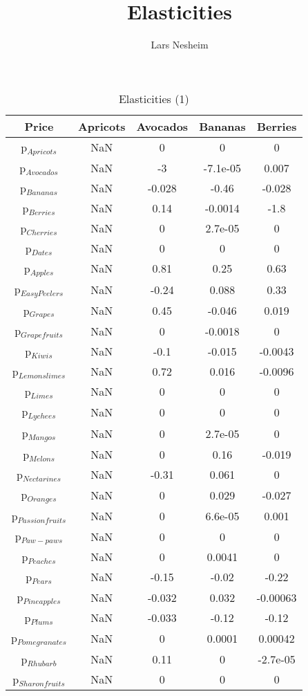 \documentclass[11pt]{article}
\title{Elasticities}
\author{Lars Nesheim}
\date{}
\begin{document}
\maketitle
\begin{table}[h]
\caption{Elasticities (1)}
\label{Table: elasticities 1}
\begin{center}
\begin{tabular}{ccccc}
Price & Apricots & Avocados & Bananas & Berries \\ \hline
p$_{Apricots}$ & NaN & 0 & 0 & 0 \\ 
p$_{Avocados}$ & NaN & -3 & -7.1e-05 & 0.007 \\ 
p$_{Bananas}$ & NaN & -0.028 & -0.46 & -0.028 \\ 
p$_{Berries}$ & NaN & 0.14 & -0.0014 & -1.8 \\ 
p$_{Cherries}$ & NaN & 0 & 2.7e-05 & 0 \\ 
p$_{Dates}$ & NaN & 0 & 0 & 0 \\ 
p$_{Apples}$ & NaN & 0.81 & 0.25 & 0.63 \\ 
p$_{Easy Peelers}$ & NaN & -0.24 & 0.088 & 0.33 \\ 
p$_{Grapes}$ & NaN & 0.45 & -0.046 & 0.019 \\ 
p$_{Grapefruits}$ & NaN & 0 & -0.0018 & 0 \\ 
p$_{Kiwis}$ & NaN & -0.1 & -0.015 & -0.0043 \\ 
p$_{Lemonslimes}$ & NaN & 0.72 & 0.016 & -0.0096 \\ 
p$_{Limes}$ & NaN & 0 & 0 & 0 \\ 
p$_{Lychees}$ & NaN & 0 & 0 & 0 \\ 
p$_{Mangos}$ & NaN & 0 & 2.7e-05 & 0 \\ 
p$_{Melons}$ & NaN & 0 & 0.16 & -0.019 \\ 
p$_{Nectarines}$ & NaN & -0.31 & 0.061 & 0 \\ 
p$_{Oranges}$ & NaN & 0 & 0.029 & -0.027 \\ 
p$_{Passion fruits}$ & NaN & 0 & 6.6e-05 & 0.001 \\ 
p$_{Paw-paws}$ & NaN & 0 & 0 & 0 \\ 
p$_{Peaches}$ & NaN & 0 & 0.0041 & 0 \\ 
p$_{Pears}$ & NaN & -0.15 & -0.02 & -0.22 \\ 
p$_{Pineapples}$ & NaN & -0.032 & 0.032 & -0.00063 \\ 
p$_{Plums}$ & NaN & -0.033 & -0.12 & -0.12 \\ 
p$_{Pomegranates}$ & NaN & 0 & 0.0001 & 0.00042 \\ 
p$_{Rhubarb}$ & NaN & 0.11 & 0 & -2.7e-05 \\ 
p$_{Sharon fruits}$ & NaN & 0 & 0 & 0 \\ 
\end{tabular}
\end{center}
\end{table}
\end{document}
